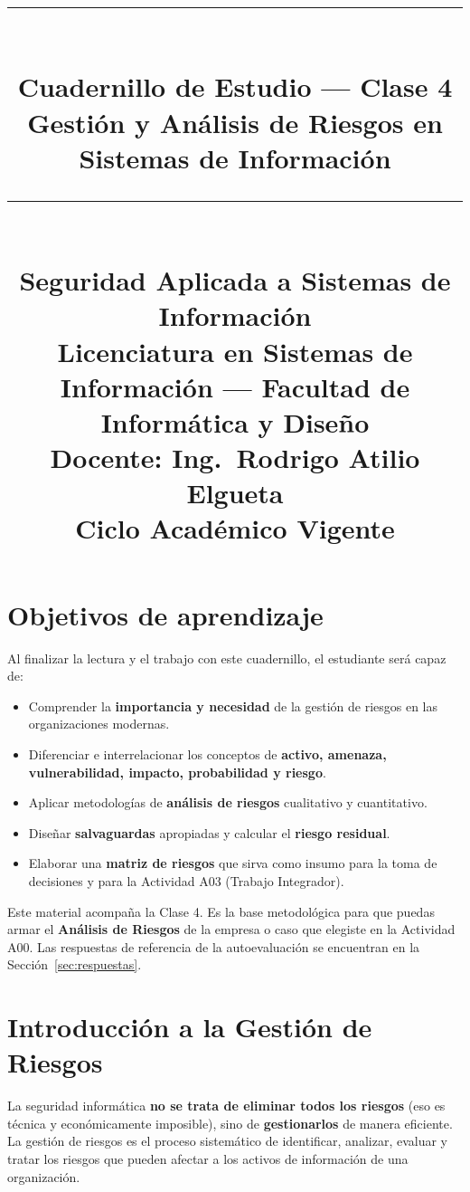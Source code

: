 \documentclass[11pt,a4paper]{article}
\title{%
  \rule{\textwidth}{1pt}\\[0.4cm]
  \textbf{\Large Cuadernillo de Estudio --- Clase 4}\\[0.2cm]
  \large Gestión y Análisis de Riesgos en Sistemas de Información\\[0.2cm]
  \rule{\textwidth}{1pt}\\[0.4cm]
  \normalsize Seguridad Aplicada a Sistemas de Información\\
  Licenciatura en Sistemas de Información --- Facultad de Informática y Diseño\\
  Docente: Ing.\ Rodrigo Atilio Elgueta\\[0.2cm]
  \small Ciclo Académico Vigente
}
\author{}
\date{}
\begin{document}
\maketitle
\thispagestyle{fancy}
\tableofcontents
\newpage

\section{Objetivos de aprendizaje}
Al finalizar la lectura y el trabajo con este cuadernillo, el estudiante será capaz de:

\begin{itemize}[leftmargin=*]
  \item Comprender la \textbf{importancia y necesidad} de la gestión de riesgos en las organizaciones modernas.
  \item Diferenciar e interrelacionar los conceptos de \textbf{activo, amenaza, vulnerabilidad, impacto, probabilidad y riesgo}.
  \item Aplicar metodologías de \textbf{análisis de riesgos} cualitativo y cuantitativo.
  \item Diseñar \textbf{salvaguardas} apropiadas y calcular el \textbf{riesgo residual}.
  \item Elaborar una \textbf{matriz de riesgos} que sirva como insumo para la toma de decisiones y para la Actividad A03 (Trabajo Integrador).
\end{itemize}

\begin{clave}
Este material acompaña la Clase 4. Es la base metodológica para que puedas armar el \textbf{Análisis de Riesgos} de la empresa o caso que elegiste en la Actividad A00. Las respuestas de referencia de la autoevaluación se encuentran en la Sección~\ref{sec:respuestas}.
\end{clave}

\section{Introducción a la Gestión de Riesgos}
La seguridad informática \textbf{no se trata de eliminar todos los riesgos} (eso es técnica y económicamente imposible), sino de \textbf{gestionarlos} de manera eficiente. La gestión de riesgos es el proceso sistemático de identificar, analizar, evaluar y tratar los riesgos que pueden afectar a los activos de información de una organización.
\end{document}
